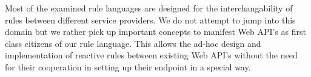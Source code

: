 Most of the examined rule languages are designed for the interchangability of rules between different service providers. We do not attempt to jump into this domain but we rather pick up important concepts to manifest Web API's as first class citizens of our rule language. This allows the ad-hoc design and implementation of reactive rules between existing Web API's without the need for their cooperation in setting up their endpoint in a special way.





